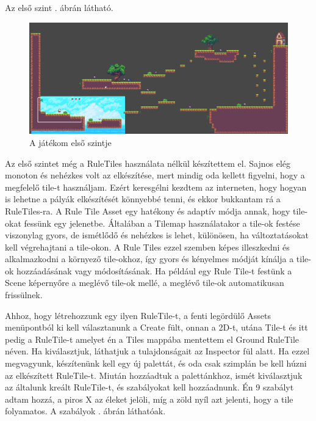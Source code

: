 Az első szint . ábrán látható.

\begin{figure}[ht]
\centering
\includegraphics[width=\linewidth]{images/firstlevel.png}
\caption{A játékom első szintje}
\label{fig:firstlevel}
\end{figure}


Az első szintet még a RuleTiles használata nélkül készítettem el. Sajnos elég monoton és nehézkes volt az elkészítése, mert mindig oda kellett figyelni, hogy a megfelelő tile-t használjam. Ezért keresgélni kezdtem az interneten, hogy hogyan is lehetne a pályák elkészítését könnyebbé tenni, és ekkor bukkantam rá a RuleTiles-ra. A Rule Tile Asset egy hatékony és adaptív módja annak, hogy tile-okat fessünk egy jelenetbe. Általában a Tilemap használatakor a tile-ok festése viszonylag gyors, de ismétlődő és nehézkes is lehet, különösen, ha változtatásokat kell végrehajtani a tile-okon. A Rule Tiles ezzel szemben képes illeszkedni és alkalmazkodni a környező tile-okhoz, így gyors és kényelmes módját kínálja a tile-ok hozzáadásának vagy módosításának. Ha például egy Rule Tile-t festünk a Scene képernyőre a meglévő tile-ok mellé, a meglévő tile-ok automatikusan frissülnek.\cite{unityruletile}

Ahhoz, hogy létrehozzunk egy ilyen RuleTile-t, a fenti legördülő Assets menüpontból ki kell választanunk a Create fült, onnan a 2D-t, utána Tile-t és itt pedig a RuleTile-t amelyet én a Tiles mappába mentettem el Ground RuleTile néven. Ha kiválasztjuk, láthatjuk a tulajdonságait az Inspector fül alatt. Ha ezzel megvagyunk, készítenünk kell egy új palettát, és oda csak szimplán be kell húzni az elkészített RuleTile-t. Miután hozzáadtuk a palettánkhoz, ismét kiválasztjuk az általunk kreált RuleTile-t, és szabályokat kell hozzáadnunk.\cite{unityruletile} Én 9 szabályt adtam hozzá, a piros X az éleket jelöli, míg a zöld nyíl azt jelenti, hogy a tile folyamatos. A szabályok . ábrán láthatóak.

